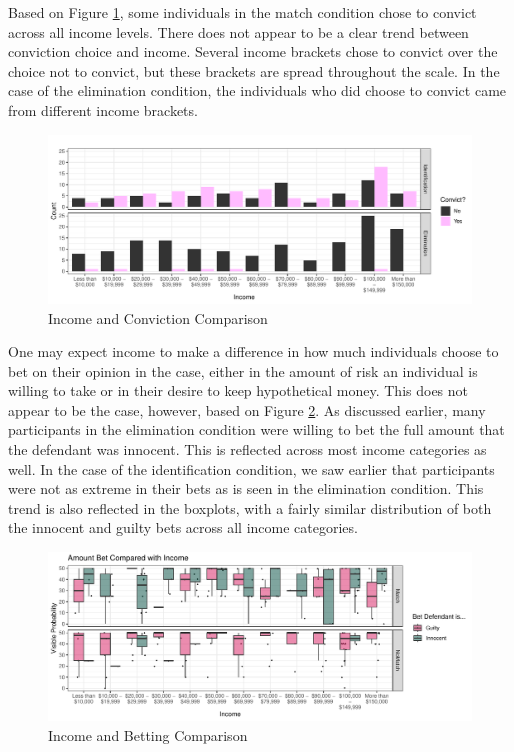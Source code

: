 \documentclass[print]{nuthesis}
\begin{document}
Based on Figure \ref{fig:convictsincome}, some individuals in the match condition chose to convict across all income levels.
There does not appear to be a clear trend between conviction choice and income.
Several income brackets chose to convict over the choice not to convict, but these brackets are spread throughout the scale.
In the case of the elimination condition, the individuals who did choose to convict came from different income brackets.

\begin{figure}

{\centering \includegraphics[width=\linewidth]{thesis_files/figure-latex/convictsincome-1} 

}

\caption{Income and Conviction Comparison}\label{fig:convictsincome}
\end{figure}

One may expect income to make a difference in how much individuals choose to bet on their opinion in the case, either in the amount of risk an individual is willing to take or in their desire to keep hypothetical money.
This does not appear to be the case, however, based on Figure \ref{fig:incomebet}.
As discussed earlier, many participants in the elimination condition were willing to bet the full amount that the defendant was innocent.
This is reflected across most income categories as well.
In the case of the identification condition, we saw earlier that participants were not as extreme in their bets as is seen in the elimination condition.
This trend is also reflected in the boxplots, with a fairly similar distribution of both the innocent and guilty bets across all income categories.

\begin{figure}

{\centering \includegraphics[width=\linewidth]{thesis_files/figure-latex/incomebet-1} 

}

\caption{Income and Betting Comparison}\label{fig:incomebet}
\end{figure}
\end{document}
